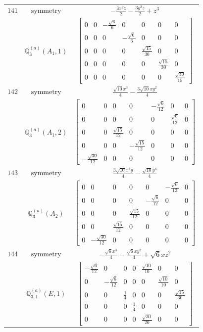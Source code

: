 \documentclass[fleqn,8pt,landscape]{jsarticle}
\begin{document}
\begin{longtable}{ccc}
$ 141 $ & $ \text{symmetry} $ & $ - \frac{3 x^{2} z}{2} - \frac{3 y^{2} z}{2} + z^{3} $ \\
$  $ & $ \mathbb{Q}_{3}^{(a)}(A_{1},1) $ & $ \begin{bmatrix} 0 & 0 & - \frac{\sqrt{6}}{6} & 0 & 0 & 0 & 0 \\ 0 & 0 & 0 & - \frac{\sqrt{6}}{6} & 0 & 0 & 0 \\ 0 & 0 & 0 & 0 & \frac{\sqrt{15}}{30} & 0 & 0 \\ 0 & 0 & 0 & 0 & 0 & \frac{\sqrt{15}}{30} & 0 \\ 0 & 0 & 0 & 0 & 0 & 0 & \frac{\sqrt{30}}{15} \end{bmatrix} $ \\ \hline
$ 142 $ & $ \text{symmetry} $ & $ \frac{\sqrt{10} x^{3}}{4} - \frac{3 \sqrt{10} x y^{2}}{4} $ \\
$  $ & $ \mathbb{Q}_{3}^{(a)}(A_{1},2) $ & $ \begin{bmatrix} 0 & 0 & 0 & 0 & - \frac{\sqrt{6}}{12} & 0 & 0 \\ 0 & 0 & 0 & 0 & 0 & \frac{\sqrt{6}}{12} & 0 \\ 0 & 0 & \frac{\sqrt{15}}{12} & 0 & 0 & 0 & 0 \\ 0 & 0 & 0 & - \frac{\sqrt{15}}{12} & 0 & 0 & 0 \\ - \frac{\sqrt{30}}{12} & 0 & 0 & 0 & 0 & 0 & 0 \end{bmatrix} $ \\ \hline
$ 143 $ & $ \text{symmetry} $ & $ \frac{3 \sqrt{10} x^{2} y}{4} - \frac{\sqrt{10} y^{3}}{4} $ \\
$  $ & $ \mathbb{Q}_{3}^{(a)}(A_{2}) $ & $ \begin{bmatrix} 0 & 0 & 0 & 0 & 0 & - \frac{\sqrt{6}}{12} & 0 \\ 0 & 0 & 0 & 0 & - \frac{\sqrt{6}}{12} & 0 & 0 \\ 0 & 0 & 0 & \frac{\sqrt{15}}{12} & 0 & 0 & 0 \\ 0 & 0 & \frac{\sqrt{15}}{12} & 0 & 0 & 0 & 0 \\ 0 & - \frac{\sqrt{30}}{12} & 0 & 0 & 0 & 0 & 0 \end{bmatrix} $ \\ \hline
$ 144 $ & $ \text{symmetry} $ & $ - \frac{\sqrt{6} x^{3}}{4} - \frac{\sqrt{6} x y^{2}}{4} + \sqrt{6} x z^{2} $ \\
$  $ & $ \mathbb{Q}_{3,1}^{(a)}(E,1) $ & $ \begin{bmatrix} - \frac{\sqrt{6}}{12} & 0 & 0 & 0 & \frac{\sqrt{10}}{10} & 0 & 0 \\ 0 & - \frac{\sqrt{6}}{12} & 0 & 0 & 0 & \frac{\sqrt{10}}{10} & 0 \\ 0 & 0 & \frac{1}{4} & 0 & 0 & 0 & \frac{\sqrt{15}}{30} \\ 0 & 0 & 0 & \frac{1}{4} & 0 & 0 & 0 \\ 0 & 0 & 0 & 0 & \frac{\sqrt{30}}{20} & 0 & 0 \end{bmatrix} $ \\ \hline

\end{longtable}
\end{document}
